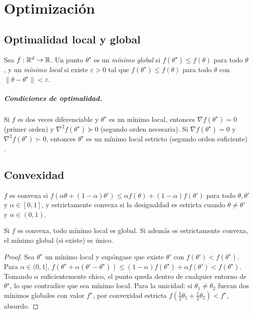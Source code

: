 \chapter{Optimización}
\label{cap:optimizacion}

\section{Optimalidad local y global}

\begin{definicion}
Sea $f:\mathbb{R}^d\to\mathbb{R}$. Un punto $\theta^\star$ es un \emph{mínimo global} si $f(\theta^\star)\le f(\theta)$ para todo $\theta$, y un \emph{mínimo local} si existe $\varepsilon>0$ tal que $f(\theta^\star)\le f(\theta)$ para todo $\theta$ con $\|\theta-\theta^\star\|<\varepsilon$.
\end{definicion}

\paragraph{Condiciones de optimalidad.} Si $f$ es dos veces diferenciable y $\theta^\star$ es un mínimo local, entonces $\nabla f(\theta^\star) = 0$ (primer orden) y $\nabla^2 f(\theta^\star)\succeq 0$ (segundo orden necesaria). Si $\nabla f(\theta^\star) = 0$ y $\nabla^2 f(\theta^\star)\succ 0$, entonces $\theta^\star$ es un mínimo local estricto (segundo orden suficiente) \parencite[cap.~2]{nocedal2006}.

\section{Convexidad}

\begin{definicion}
$f$ es convexa si $f(\alpha\theta + (1-\alpha)\theta')\le\alpha f(\theta)+(1-\alpha)f(\theta')$ para todo $\theta,\theta'$ y $\alpha\in[0,1]$, y estrictamente convexa si la desigualdad es estricta cuando $\theta\ne\theta'$ y $\alpha\in(0,1)$.
\end{definicion}

\begin{teorema}\label{teo:local_global}
Si $f$ es convexa, todo mínimo local es global. Si además es estrictamente convexa, el mínimo global (si existe) es único.
\end{teorema}
\begin{proof}
Sea $\theta^\star$ un mínimo local y supóngase que existe $\theta'$ con $f(\theta') < f(\theta^\star)$. Para $\alpha\in(0,1]$, $f(\theta^\star + \alpha(\theta'-\theta^\star)) \le (1-\alpha)f(\theta^\star) + \alpha f(\theta') < f(\theta^\star)$. Tomando $\alpha$ suficientemente chico, el punto queda dentro de cualquier entorno de $\theta^\star$, lo que contradice que sea mínimo local. Para la unicidad: si $\theta_1\ne\theta_2$ fueran dos mínimos globales con valor $f^\star$, por convexidad estricta $f(\tfrac12\theta_1+\tfrac12\theta_2)<f^\star$, absurdo.
\end{proof}

